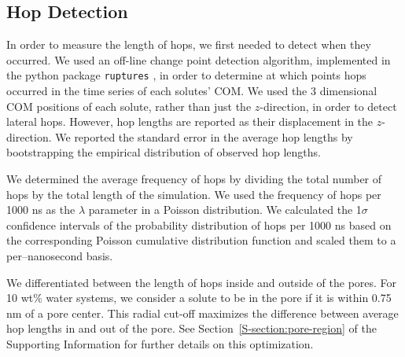 \documentclass[journal=jpcbfk,manuscript=article]{achemso}
\begin{document}

  \subsection{Hop Detection}\label{method:hop_detection}
  
  In order to measure the length of hops, we first needed to detect
  when they occurred. We used an off-line change point detection 
  algorithm, implemented in the python package \texttt{ruptures}
  \cite{truong_ruptures:_2018}, in order to determine at which 
  points hops occurred in the time series of each solutes' COM. We
  used the 3 dimensional COM positions of each solute, rather than
  just the $z$-direction, in order to detect lateral hops. However,
  hop lengths are reported as their displacement in the $z$-direction.
  We reported the standard error in the average hop lengths by 
  bootstrapping the empirical distribution of observed
  hop lengths.\cite{efron_introduction_1994}

  We determined the average frequency of hops by dividing the total number of 
  hops by the total length of the simulation. We used the frequency of
  hops per 1000 ns as the $\lambda$ parameter in a Poisson distribution.
  We calculated the 1$\sigma$ confidence intervals of the probability %
  distribution of hops per 1000 ns based on the corresponding Poisson 
  cumulative distribution function and scaled them to a per--nanosecond basis. 
 
  
  We differentiated between the length of hops inside and outside of the 
  pores. For 10 wt\% water systems, we consider a solute to be in the pore
  if it is within 0.75 nm of a pore center. This radial cut-off maximizes 
  the difference between average hop lengths in and out of the pore. 
  See Section~\ref{S-section:pore-region} of the Supporting
  Information for further details on this optimization.
  
\end{document}
